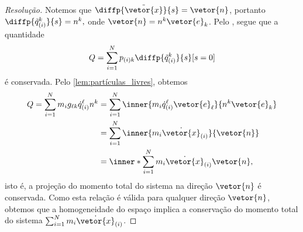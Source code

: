 \begin{proof}[Resolução]
    Notemos que \(\diffp{\tilde{\vetor{x}}}{s} = \vetor{n}\), portanto \(\diffp{\tilde{q}_{(i)}^k}{s} = n^k,\) onde \(\vetor{n} = n^k\vetor{e}_k\). Pelo , segue que a quantidade
    \begin{equation*}
        Q = \sum_{i = 1}^N p_{(i)k} \diffp{\tilde{q}_{(i)}^k}{s}[s=0]
    \end{equation*}
    é conservada. Pelo \cref{lem:partículas_livres}, obtemos
    \begin{align*}
        Q = \sum_{i=1}^N m_i g_{\ell k}\dot{q}_{(i)}^\ell n^k &= \sum_{i = 1}^N \inner{m_i \dot{q}_{(i)}^\ell\vetor{e}_\ell}{n^k\vetor{e}_k}\\
                                                              &= \sum_{i = 1}^N \inner{m_i \dot{\vetor{x}}_{(i)}}{\vetor{n}}\\
                                                              &= \inner*{\sum_{i = 1}^N m_i\dot{\vetor{x}}_{(i)}}{\vetor{n}},
    \end{align*}
    isto é, a projeção do momento total do sistema na direção \(\vetor{n}\) é conservada. Como esta relação é válida para qualquer direção \(\vetor{n}\), obtemos que a homogeneidade do espaço implica a conservação do momento total do sistema \(\sum_{i = 1}^N m_i \dot{\vetor{x}}_{(i)}\).
\end{proof}
